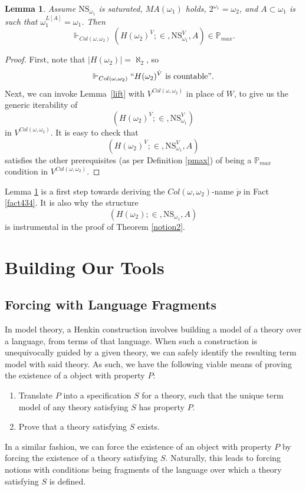 \documentclass[12pt, twoside]{memoir}
\numberwithin{equation}{section}
\newtheorem{lem}[thm]{Lemma}
\theoremstyle{definition}
\theoremstyle{remark}
\theoremstyle{definition}
\theoremstyle{definition}
\theoremstyle{definition}
\theoremstyle{remark}
\newcommand{\blankpage}{
\newpage
\thispagestyle{empty}
\mbox{}
\newpage
}
\begin{document}
\begin{lem}\label{ho2}
Assume $\mathrm{NS}_{\omega_1}$ is saturated, $MA(\omega_1)$ holds, $2^{\omega_1} = \omega_2$, and $A \subset \omega_1$ is such that $\omega_1^{L[A]} = \omega_1$. Then $$\Vdash_{Col(\omega, \omega_2)} (H(\omega_2)^{\dot{V}}; \in, \mathrm{NS}_{\omega_1}^{\dot{V}}, A) \in \mathbb{P}_{max}.$$
\end{lem}
\begin{proof}
First, note that $|H(\omega_2)| = \aleph_2$, so $$\Vdash_{Col(\omega, \omega_2)} ``H(\omega_2)^{\dot{V}} \text{ is countable}".$$ Next, we can invoke Lemma~\ref{lift} with $V^{Col(\omega, \omega_2)}$ in place of $W$, to give us the generic iterability of $$(H(\omega_2)^{V}; \in, \mathrm{NS}_{\omega_1}^V)$$ in $V^{Col(\omega, \omega_2)}$. It is easy to check that $$(H(\omega_2)^{V}; \in, \mathrm{NS}_{\omega_1}^V, A)$$ satisfies the other prerequisites (as per Definition \ref{pmax}) of being a $\mathbb{P}_{max}$ condition in $V^{Col(\omega, \omega_2)}$. 
\end{proof}

Lemma \ref{ho2} is a first step towards deriving the $Col(\omega, \omega_2)$-name $\dot{p}$ in Fact \ref{fact434}. It is also why the structure 
\begin{equation*}
    (H(\omega_2); \in, \mathrm{NS}_{\omega_1}, A)
\end{equation*}
is instrumental in the proof of Theorem \ref{notion2}.

\blankpage

\part{Building Our Tools}\label{part2}

\chapter{Forcing with Language Fragments}\label{setupsec}

In model theory, a Henkin construction involves building a model of a theory over a language, from terms of that language. When such a construction is unequivocally guided by a given theory, we can safely identify the resulting term model with said theory. As such, we have the following viable means of proving the existence of a object with property $P$: 
\begin{enumerate}
    \item Translate $P$ into a specification $S$ for a theory, such that the unique term model of any theory satisfying $S$ has property $P$.
    \item Prove that a theory satisfying $S$ exists.
\end{enumerate}
In a similar fashion, we can force the existence of an object with property $P$ by forcing the existence of a theory satisfying $S$. Naturally, this leads to forcing notions with conditions being fragments of the language over which a theory satisfying $S$ is defined.
\end{document}
